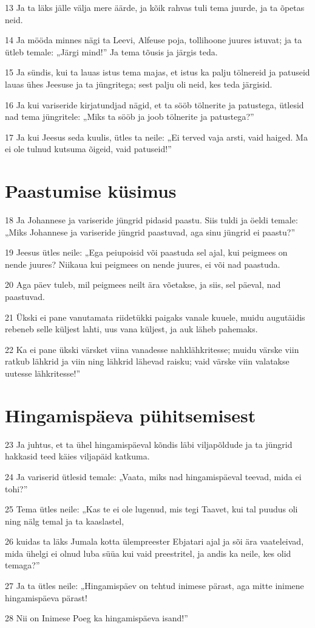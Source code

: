 \par 13 Ja ta läks jälle välja mere äärde, ja kõik rahvas tuli tema juurde, ja ta õpetas neid.
\par 14 Ja mööda minnes nägi ta Leevi, Alfeuse poja, tollihoone juures istuvat; ja ta ütleb temale: „Järgi mind!” Ja tema tõusis ja järgis teda.
\par 15 Ja sündis, kui ta lauas istus tema majas, et istus ka palju tölnereid ja patuseid lauas ühes Jeesuse ja ta jüngritega; sest palju oli neid, kes teda järgisid.
\par 16 Ja kui variseride kirjatundjad nägid, et ta sööb tölnerite ja patustega, ütlesid nad tema jüngritele: „Miks ta sööb ja joob tölnerite ja patustega?”
\par 17 Ja kui Jeesus seda kuulis, ütles ta neile: „Ei terved vaja arsti, vaid haiged. Ma ei ole tulnud kutsuma õigeid, vaid patuseid!”

\section*{Paastumise küsimus}

\par 18 Ja Johannese ja variseride jüngrid pidasid paastu. Siis tuldi ja öeldi temale: „Miks Johannese ja variseride jüngrid paastuvad, aga sinu jüngrid ei paastu?”
\par 19 Jeesus ütles neile: „Ega peiupoisid või paastuda sel ajal, kui peigmees on nende juures? Niikaua kui peigmees on nende juures, ei või nad paastuda.
\par 20 Aga päev tuleb, mil peigmees neilt ära võetakse, ja siis, sel päeval, nad paastuvad.
\par 21 Ükski ei pane vanutamata riidetükki paigaks vanale kuuele, muidu augutäidis rebeneb selle küljest lahti, uus vana küljest, ja auk läheb pahemaks.
\par 22 Ka ei pane ükski värsket viina vanadesse nahklähkritesse; muidu värske viin ratkub lähkrid ja viin ning lähkrid lähevad raisku; vaid värske viin valatakse uutesse lähkritesse!”

\section*{Hingamispäeva pühitsemisest}

\par 23 Ja juhtus, et ta ühel hingamispäeval kõndis läbi viljapõldude ja ta jüngrid hakkasid teed käies viljapäid katkuma.
\par 24 Ja variserid ütlesid temale: „Vaata, miks nad hingamispäeval teevad, mida ei tohi?”
\par 25 Tema ütles neile: „Kas te ei ole lugenud, mis tegi Taavet, kui tal puudus oli ning nälg temal ja ta kaaslastel,
\par 26 kuidas ta läks Jumala kotta ülempreester Ebjatari ajal ja sõi ära vaateleivad, mida ühelgi ei olnud luba süüa kui vaid preestritel, ja andis ka neile, kes olid temaga?”
\par 27 Ja ta ütles neile: „Hingamispäev on tehtud inimese pärast, aga mitte inimene hingamispäeva pärast!
\par 28 Nii on Inimese Poeg ka hingamispäeva isand!”


